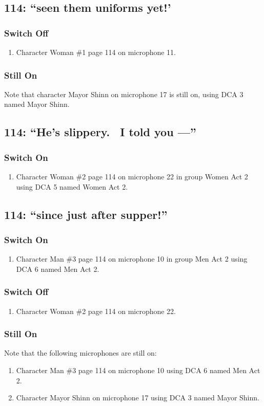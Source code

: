 \subsection* {114: ``seen them uniforms yet!'}
\subsubsection* {Switch Off}
\begin{enumerate}
\item Character Woman \#1 page 114 on microphone 11.
\end{enumerate}
\subsubsection* {Still On}
Note that character Mayor Shinn on microphone 17 is still on, using DCA 3 named Mayor Shinn.\subsection* {114: ``He's slippery.~ I told you ---''}
\subsubsection* {Switch On}
\begin{enumerate}
\item Character Woman \#2 page 114 on microphone 22 in group Women Act 2 using DCA 5 named Women Act 2.
\end{enumerate}
\subsection* {114: ``since just after supper!''}
\subsubsection* {Switch On}
\begin{enumerate}
\item Character Man \#3 page 114 on microphone 10 in group Men Act 2 using DCA 6 named Men Act 2.
\end{enumerate}
\subsubsection* {Switch Off}
\begin{enumerate}
\item Character Woman \#2 page 114 on microphone 22.
\end{enumerate}
\subsubsection* {Still On}
Note that the following microphones are still on:
\begin{enumerate}
\item Character Man \#3 page 114 on microphone 10 using DCA 6 named Men Act 2.
\item Character Mayor Shinn on microphone 17 using DCA 3 named Mayor Shinn.
\end{enumerate}
